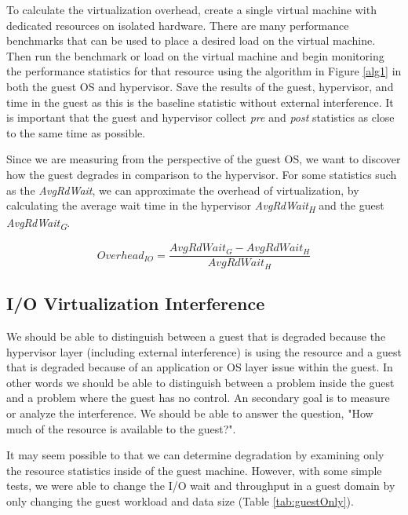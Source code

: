 To calculate the virtualization overhead, create a single virtual machine with dedicated resources on isolated hardware.  
There are many performance benchmarks that can be used \cite{katcher, tikotekar, hplBench} to place a desired load on the virtual machine. 
Then run the benchmark or load on the virtual machine and begin monitoring the performance statistics for that resource using the algorithm in Figure \ref{alg1} in both the guest OS and hypervisor. 
Save the results of the guest, hypervisor, and time in the guest as this is the baseline statistic without external interference.
It is important that the guest and hypervisor collect \emph{pre} and \emph{post} statistics as close to the same time as possible.  

Since we are measuring from the perspective of the guest OS, we want to discover how the guest degrades in comparison to the hypervisor.  
For some statistics such as the \emph{AvgRdWait}, we can approximate the overhead of virtualization, by calculating the average wait time in the hypervisor \emph{AvgRdWait\textsubscript{H}} and the guest \emph{AvgRdWait\textsubscript{G}}.

\begin{equation}
  Overhead_{IO} = \frac{AvgRdWait_G - AvgRdWait_H}{AvgRdWait_H} 
\end{equation}

\subsection{I/O Virtualization Interference}
We should be able to distinguish between a guest that is degraded because the hypervisor layer (including external interference) is using the resource and a guest that is degraded because of an application or OS layer issue within the guest.  In other words we should be able to distinguish between a problem inside the guest and a problem where the guest has no control.  An secondary goal is to measure or analyze the interference.  We should be able to answer the question, "How much of the resource is available to the guest?".

It may seem possible to that we can determine degradation by examining only the resource statistics inside of the guest machine.  However, with some simple tests, we were able to change the I/O wait and throughput in a guest domain by only changing the guest workload and data size (Table \ref{tab:guestOnly}).
 
